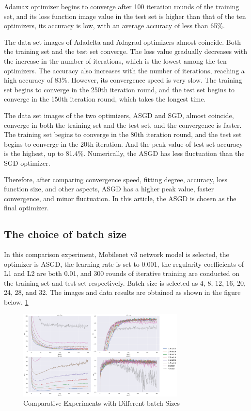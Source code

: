 \documentclass[a4paper,fleqn]{cas-sc}
\begin{document}
Adamax optimizer begins to converge after 100 iteration rounds of the training set, and its loss function image value in the test set is higher than that of the ten optimizers, its accuracy is low, with an average accuracy of less than 65\%. 

The data set images of Adadelta and Adagrad optimizers almost coincide. Both the training set and the test set converge. The loss value gradually decreases with the increase in the number of iterations, which is the lowest among the ten optimizers. The accuracy also increases with the number of iterations, reaching a high accuracy of 83\%. However, its convergence speed is very slow. The training set begins to converge in the 250th iteration round, and the test set begins to converge in the 150th iteration round, which takes the longest time. 

The data set images of the two optimizers, ASGD and SGD, almost coincide, converge in both the training set and the test set, and the convergence is faster. The training set begins to converge in the 80th iteration round, and the test set begins to converge in the 20th iteration. And the peak value of test set accuracy is the highest, up to 81.4\%. Numerically, the ASGD has less fluctuation than the SGD optimizer. 

Therefore, after comparing convergence speed, fitting degree, accuracy, loss function size, and other aspects, ASGD has a higher peak value, faster convergence, and minor fluctuation. In this article, the ASGD is chosen as the final optimizer.

\subsection{The choice of batch size}
In this comparison experiment, Mobilenet v3 network model is selected, the optimizer is ASGD, the learning rate is set to 0.001, the regularity coefficients of L1 and L2 are both 0.01, and 300 rounds of iterative training are conducted on the training set and test set respectively. Batch size is selected as 4, 8, 12, 16, 20, 24, 28, and 32. The images and data results are obtained as shown in the figure below. \ref{fig:f6}
\begin{figure}
\centering
\includegraphics[width=0.75\textwidth]{figs_rev1/f6.png}
\caption{Comparative Experiments with Different batch Sizes}
\label{fig:f6}
\end{figure}
\end{document}
